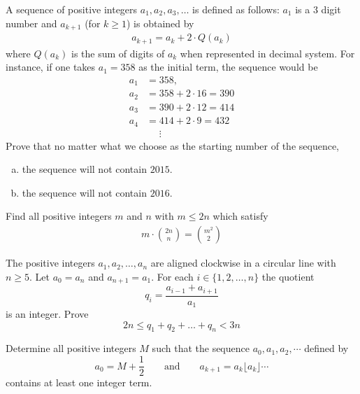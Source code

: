 \documentclass[problems.tex]{subfile}
\begin{document}
	\begin{problem}
		A sequence of positive integers $a_1, a_2, a_3, \dots$ is defined as follows: $a_1$ is a $3$ digit number and $a_{k+1}$ (for $k \geq 1$) is obtained by
		\begin{align*}
			a_{k+1} = a_k + 2 \cdot Q(a_k)
		\end{align*}
		where $Q(a_k)$ is the sum of digits of $a_k$ when represented in decimal system. For instance, if one takes $a_1 = 358$ as the initial term, the sequence would be
		\begin{align*}
			a_1 &= 358,\\
			a_2 &= 358 + 2 \cdot 16 = 390\\
			a_3 &= 390+ 2 \cdot 12 = 414\\
			a_4 &= 414 + 2 \cdot 9 = 432\\
			&\phantom{=}\vdots
		\end{align*}
		Prove that no matter what we choose as the starting number of the sequence,
		\begin{enumerate}[(a)]
			\item the sequence will not contain $2015$.
			\item the sequence will not contain $2016$.
		\end{enumerate}
	\end{problem}

	\begin{problem}
		Find all positive integers $m$ and $n$ with $m \leq 2n$ which satisfy
		\begin{align*}
			m \cdot \binom{2n}{n} = \binom{m^2}{2}
		\end{align*}
	\end{problem}

	\begin{problem}
		The positive integers $a_1,a_2, \dots, a_n$ are aligned clockwise in a circular line with $n \geq 5$. Let $a_0=a_n$ and $a_{n+1}=a_1$. For each $i \in \{1,2,\dots,n \}$ the quotient \[ q_i=\frac{a_{i-1}+a_{i+1}}{a_1} \]is an integer. Prove \[ 2n \leq q_1+q_2+\dots+q_n < 3n \] %
	\end{problem}

	\begin{problem}
		Determine all positive integers $M$ such that the sequence $a_0, a_1, a_2, \cdots$ defined by \[ a_0 = M + \frac{1}{2} \qquad \textrm{and} \qquad a_{k+1} = a_k\lfloor a_k \rfloor\cdots \]contains at least one integer term. %
	\end{problem}
\end{document}
